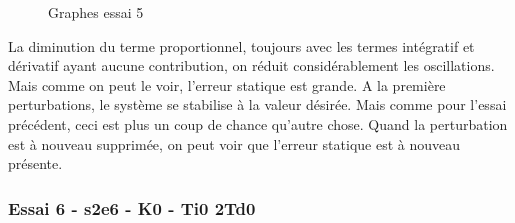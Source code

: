 \begin{figure}[H]
    \centering
    \caption{Graphes essai 5}
    \label{fig:essai-5}
\end{figure}

La diminution du terme proportionnel, toujours avec les termes intégratif et dérivatif
ayant aucune contribution, on réduit considérablement les oscillations. Mais
comme on peut le voir, l'erreur statique est grande. A la première perturbations,
le système se stabilise à la valeur désirée. Mais comme pour l'essai précédent,
ceci est plus un coup de chance qu'autre chose. Quand la perturbation est à nouveau
supprimée, on peut voir que l'erreur statique est à nouveau présente.

\subsubsection{Essai 6 - s2e6 - K0 - Ti0 2Td0}

